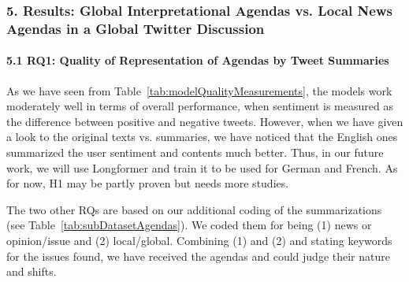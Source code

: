 \subsubsection{5. Results: Global Interpretational Agendas vs. Local News Agendas in a Global Twitter Discussion}

\paragraph{5.1 RQ1: Quality of Representation of Agendas by Tweet Summaries}
As we have seen from Table~\cref{tab:modelQualityMeasurements}, the models work moderately well in terms of overall performance, when sentiment is measured as the difference between positive and negative tweets. However, when we have given a look to the original texts vs. summaries, we have noticed that the English ones summarized the user sentiment and contents much better. Thus, in our future work, we will use Longformer and train it to be used for German and French. As for now, H1 may be partly proven but needs more studies.


The two other RQs are based on our additional coding of the summarizations (see Table~\cref{tab:subDatasetAgendas}). We coded them for being (1) news or opinion/issue and (2) local/global. Combining (1) and (2) and stating keywords for the issues found, we have received the agendas and could judge their nature and shifts.

